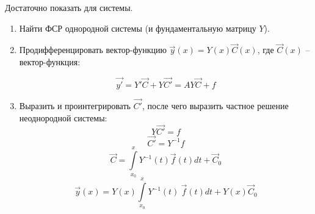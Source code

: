 Достаточно показать для системы.

\begin{enumerate}
    \item Найти ФСР однородной системы (и фундаментальную матрицу $Y$).
    \item Продифференцировать вектор-функцию $\vec{y}(x) = Y(x) \vec{C}(x)$, где $\vec{C}(x)$ -- вектор-функция:
    
    $$\vec{y'} = Y'\vec{C} + Y\vec{C'} = AY\vec{C} + f$$
    
    \item Выразить и проинтегрировать $\vec{C'}$, после чего выразить частное решение неоднородной системы:
$$Y\vec{C'} = f$$
$$\vec{C'} = Y^{-1}f$$
$$\vec{C} = \int\limits_{x_0}^xY^{-1}(t)\vec{f}(t)dt + \vec{C}_0$$
$$\vec{y}(x) = Y(x) \int\limits_{x_0}^xY^{-1}(t)~\vec{f}(t)dt + Y(x)\vec{C}_0$$
\end{enumerate}